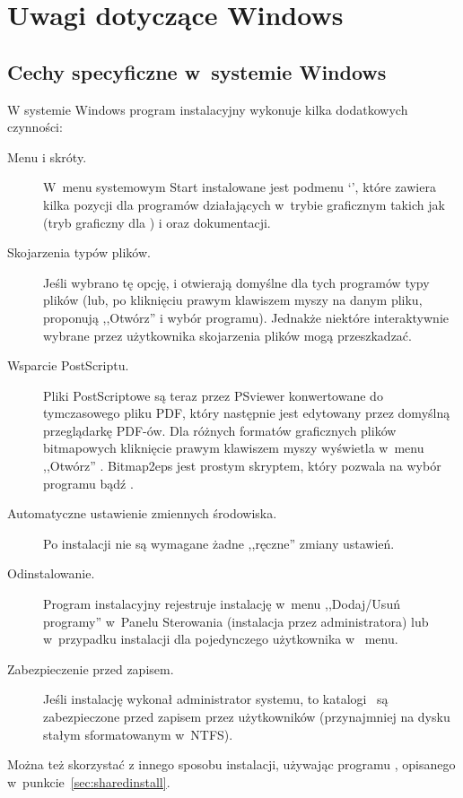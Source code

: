 \documentclass{article}
\begin{document}
\section{Uwagi dotyczące Windows}
\label{sec:windows}

\subsection{Cechy specyficzne w~systemie Windows}
\label{sec:winfeatures}

W systemie Windows program instalacyjny wykonuje kilka dodatkowych czynności:
\begin{description}
\item[Menu i skróty.]
W~menu systemowym Start  instalowane jest podmenu `\TL{}',
 które zawiera kilka pozycji dla programów działających w~trybie graficznym takich jak  (tryb graficzny dla ) i   %
  oraz dokumentacji.
\item[Skojarzenia typów plików.] Jeśli wybrano tę opcję,
  i   otwierają domyślne
  dla tych programów typy plików (lub, po kliknięciu prawym klawiszem
  myszy na danym pliku, proponują ,,Otwórz'' i wybór programu). Jednakże niektóre interaktywnie wybrane przez użytkownika skojarzenia plików mogą przeszkadzać.
  
  \item[Wsparcie PostScriptu.] Pliki PostScriptowe są teraz przez PSviewer konwertowane do tymczasowego pliku PDF, który następnie jest edytowany przez domyślną przeglądarkę PDF-ów.
Dla różnych formatów graficznych plików
 bitmapowych kliknięcie prawym klawiszem myszy wyświetla w~menu ,,Otwórz''
 . Bitmap2eps jest prostym skryptem, który pozwala
 na wybór programu  bądź .
 
\item[Automatyczne ustawienie zmiennych środowiska.]
 Po instalacji nie są wymagane żadne ,,ręczne'' zmiany ustawień.
 
\item[Odinstalowanie.]  Program instalacyjny rejestruje instalację
w~menu ,,Dodaj/Usuń programy'' w~Panelu Sterowania (instalacja przez administratora) lub  w~przypadku instalacji dla pojedynczego użytkownika w \TL\ menu.

\item[Zabezpieczenie przed zapisem.] Jeśli instalację wykonał
administrator systemu, to katalogi \TL\ są zabezpieczone przed zapisem przez użytkowników (przynajmniej na dysku stałym sformatowanym w~NTFS).
\end{description}
Można też skorzystać z innego sposobu instalacji, używając  programu ,
opisanego w~punkcie~\ref{sec:sharedinstall}.
\end{document}
